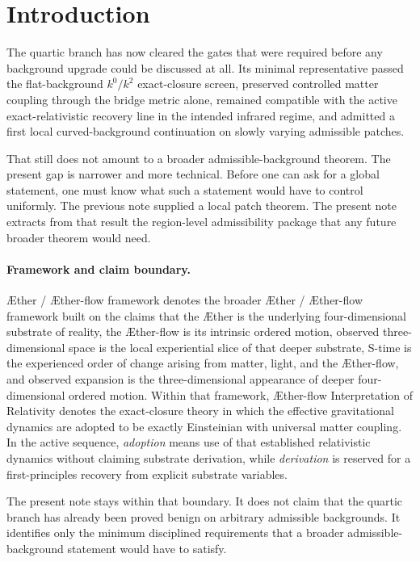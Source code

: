 \documentclass[11pt]{article}
\newcommand{\Aether}{\AE{}ther}
\newcommand{\Aflow}{\AE{}ther-flow}
\newcommand{\TheoryName}{\Aflow{} Interpretation of Relativity}
\newcommand{\TheoryProgram}{\Aether{} / \Aflow{} framework}
\begin{document}
\section{Introduction}

The quartic branch has now cleared the gates that were required before any background upgrade could be discussed at all. Its minimal representative passed the flat-background \(k^0/k^2\) exact-closure screen, preserved controlled matter coupling through the bridge metric alone, remained compatible with the active exact-relativistic recovery line in the intended infrared regime, and admitted a first local curved-background continuation on slowly varying admissible patches.

That still does not amount to a broader admissible-background theorem. The present gap is narrower and more technical. Before one can ask for a global statement, one must know what such a statement would have to control uniformly. The previous note supplied a local patch theorem. The present note extracts from that result the region-level admissibility package that any future broader theorem would need.

\paragraph{Framework and claim boundary.}
\TheoryProgram{} denotes the broader \Aether{} / \Aflow{} framework built on the claims that the \Aether{} is the underlying four-dimensional substrate of reality, the \Aflow{} is its intrinsic ordered motion, observed three-dimensional space is the local experiential slice of that deeper substrate, S-time is the experienced order of change arising from matter, light, and the \Aflow{}, and observed expansion is the three-dimensional appearance of deeper four-dimensional ordered motion. Within that framework, \TheoryName{} denotes the exact-closure theory in which the effective gravitational dynamics are adopted to be exactly Einsteinian with universal matter coupling. In the active sequence, \emph{adoption} means use of that established relativistic dynamics without claiming substrate derivation, while \emph{derivation} is reserved for a first-principles recovery from explicit substrate variables.

The present note stays within that boundary. It does not claim that the quartic branch has already been proved benign on arbitrary admissible backgrounds. It identifies only the minimum disciplined requirements that a broader admissible-background statement would have to satisfy.
\end{document}
